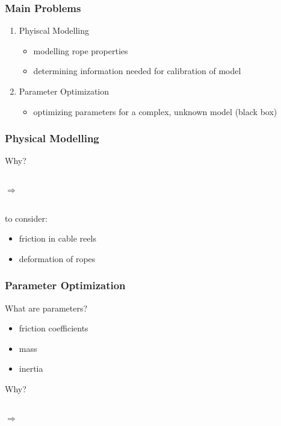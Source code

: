 \documentclass{beamer}
\begin{document}
\begin{frame}[c]
	\frametitle{Main Problems}
	\begin{enumerate}
		\item{Phyiscal Modelling}
			\begin{itemize}
				\item{modelling rope properties}
				\item{determining information needed for calibration of model}
			\end{itemize}
		\vspace{0.5cm}
		\item{Parameter Optimization}
			\begin{itemize}
				\item{optimizing parameters for a complex, unknown model (black box)}
			\end{itemize}
	\end{enumerate}
\end{frame}

\begin{frame}[c]
	\frametitle{Physical Modelling}
	Why?
	
	\vspace{0.5cm}
	
	\begin{columns}[t]
			\centering
			\centering
			$\Rightarrow$
			\centering
	\end{columns}
	
	\vspace{0.5cm}
	
	to consider:
	\begin{itemize}
		\item{friction in cable reels}
		\item{deformation of ropes}
	\end{itemize}
\end{frame}

\begin{frame}[c]
	\frametitle{Parameter Optimization}
	What are parameters?
	\begin{itemize}
		\item{friction coefficients}
		\item{mass}
		\item{inertia}
	\end{itemize}
	
	\vspace{0.5cm}
	
	Why?
	
	\vspace{0.5cm}
	
	\begin{columns}
			\centering
			\centering
			$\Rightarrow$
	\end{columns}
\end{frame}
\end{document}
